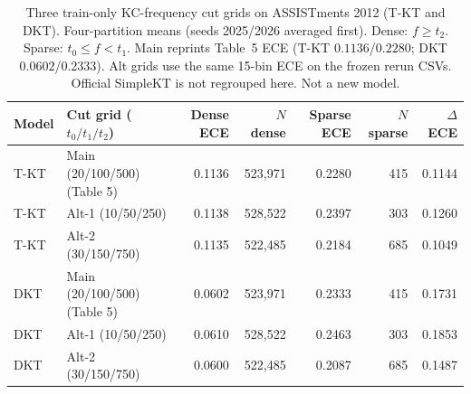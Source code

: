 \begin{table}[htbp]
\caption{Three train-only KC-frequency cut grids on ASSISTments 2012 (T-KT and DKT). Four-partition means (seeds 2025/2026 averaged first). Dense: $f\ge t_2$. Sparse: $t_0\le f<t_1$. Main reprints Table~5 ECE (T-KT $0.1136$/$0.2280$; DKT $0.0602$/$0.2333$). Alt grids use the same 15-bin ECE on the frozen rerun CSVs. Official SimpleKT is not regrouped here. Not a new model.}
\label{tab:s7_threecut}
\centering
\small
\begin{tabular}{llrrrrr}
\toprule
Model & Cut grid ($t_0/t_1/t_2$) & Dense ECE & $N$ dense & Sparse ECE & $N$ sparse & $\Delta$ECE \\
\midrule
T-KT & Main (20/100/500) (Table 5) & 0.1136 & 523,971 & 0.2280 & 415 & 0.1144 \\
T-KT & Alt-1 (10/50/250) & 0.1138 & 528,522 & 0.2397 & 303 & 0.1260 \\
T-KT & Alt-2 (30/150/750) & 0.1135 & 522,485 & 0.2184 & 685 & 0.1049 \\
DKT & Main (20/100/500) (Table 5) & 0.0602 & 523,971 & 0.2333 & 415 & 0.1731 \\
DKT & Alt-1 (10/50/250) & 0.0610 & 528,522 & 0.2463 & 303 & 0.1853 \\
DKT & Alt-2 (30/150/750) & 0.0600 & 522,485 & 0.2087 & 685 & 0.1487 \\
\bottomrule
\end{tabular}
\end{table}
